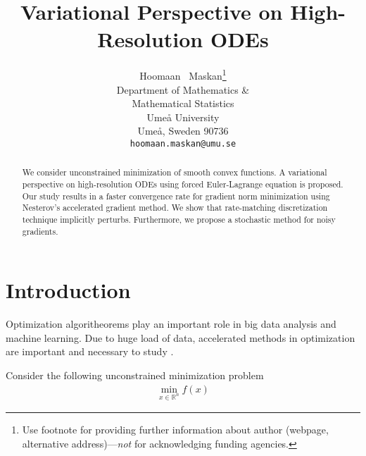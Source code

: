 \documentclass{article}
\title{Variational Perspective on High-Resolution ODEs}
\author{%
  Hoomaan ~Maskan\thanks{Use footnote for providing further information
    about author (webpage, alternative address)---\emph{not} for acknowledging
    funding agencies.} \\
  Department of Mathematics \& \\Mathematical Statistics\\
  Umeå University\\
  Umeå, Sweden 90736 \\
  \texttt{hoomaan.maskan@umu.se} \\
}
\theoremstyle{plain}
\theoremstyle{definition}
\theoremstyle{remark}
\begin{document}
\maketitle


\begin{abstract}
We consider unconstrained minimization of smooth convex functions. A variational perspective on high-resolution ODEs using forced Euler-Lagrange equation is proposed. Our study results in a faster convergence rate for gradient norm minimization using Nesterov's accelerated gradient method. We show that rate-matching discretization technique implicitly perturbs. Furthermore, we propose a stochastic method for noisy gradients. 
\end{abstract}


\section{Introduction}

Optimization algoritheorems play an important role in big data analysis and machine learning. Due to huge load of data, accelerated methods in optimization are important and necessary to study \citep{Shi2021UnderstandingTA,JMLR:v17:15-084,wilson2021lyapunov,Lessard2016AnalysisAD}. \par
Consider the following unconstrained minimization problem
\begin{align}\label{problem}
    \min_{x\in \mathbb{R}^n} f(x)
\end{align}
\end{document}
